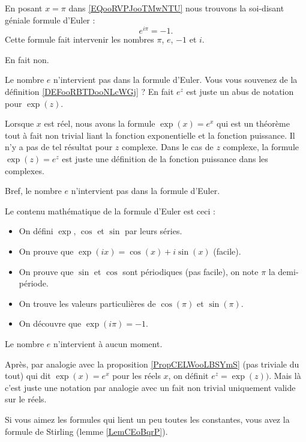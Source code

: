 \begin{normaltext}		\label{NORMooXOVSooEwjecU}
	En posant \( x=\pi\) dans \eqref{EQooRVPJooTMwNTU} nous trouvons la soi-disant géniale formule d'Euler :
	\begin{equation}
		e^{i\pi}=-1.
	\end{equation}
	Cette formule fait intervenir les nombres \( \pi\), \( e\), \( -1\) et \( i\).

	En fait non.

	Le nombre \( e\) n'intervient pas dans la formule d'Euler. Vous vous souvenez de la définition \eqref{DEFooRBTDooNLcWGj} ? En fait \( e^z\) est juste un abus de notation pour \( \exp(z)\).

	Lorsque \( x\) est réel, nous avons la formule \( \exp(x)=e^x\) qui est un théorème tout à fait non trivial liant la fonction exponentielle et la fonction puissance. Il n'y a pas de tel résultat pour \( z\) complexe. Dans le cas de \( z\) complexe, la formule \( \exp(z)=e^z\) est juste une définition de la fonction puissance dans les complexes.

	Bref, le nombre \( e\) n'intervient pas dans la formule d'Euler.

	Le contenu mathématique de la formule d'Euler est ceci :
	\begin{itemize}
		\item
		      On défini \( \exp\), \( \cos\) et \( \sin\) par leurs séries.
		\item
		      On prouve que \( \exp(ix)=\cos(x)+i\sin(x)\) (facile).
		\item
		      On prouve que \( \sin\) et \( \cos\) sont périodiques (pas facile), on note \( \pi\) la demi-période.
		\item
		      On trouve les valeurs particulières de \( \cos(\pi)\) et \( \sin(\pi)\).
		\item
		      On découvre que \( \exp(i\pi)=-1\).
	\end{itemize}
	Le nombre \( e\) n'intervient à aucun moment.

	Après, par analogie avec la proposition \ref{PropCELWooLBSYmS} (pas triviale du tout) qui dit \( \exp(x)=e^{x}\) pour les réels \( x\), on définit \( e^z=\exp(z))\). Mais là c'est juste une notation par analogie avec un fait non trivial uniquement valide sur le réels.

	Si vous aimez les formules qui lient un peu toutes les constantes, vous avez la formule de Stirling (lemme \ref{LemCEoBqrP}).
\end{normaltext}

